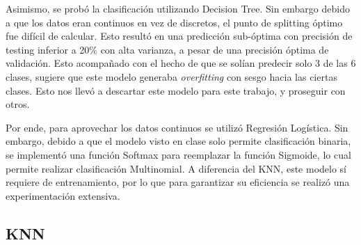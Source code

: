 \documentclass[conference]{IEEEtran}
\begin{document}
Asimismo, se probó la clasificación utilizando Decision Tree. Sin embargo debido a que los datos eran continuos en vez de discretos, el punto de splitting óptimo fue difícil de calcular. Esto resultó en una predicción sub-óptima con precisión de testing inferior a 20\% con alta varianza, a pesar de una precisión óptima de validación. Esto acompañado con el hecho de que se solían predecir solo 3 de las 6 clases, sugiere que este modelo generaba \textit{overfitting} con sesgo hacia las ciertas clases. Esto nos llevó a descartar este modelo para este trabajo, y proseguir con otros.

Por ende, para aprovechar los datos continuos se utilizó Regresión Logística. Sin embargo, debido a que el modelo visto en clase solo permite clasificación binaria, se implementó una función Softmax para reemplazar la función Sigmoide, lo cual permite realizar clasificación Multinomial. A diferencia del KNN, este modelo sí requiere de entrenamiento, por lo que para garantizar su eficiencia se realizó una experimentación extensiva.

\subsection{KNN}
\end{document}
